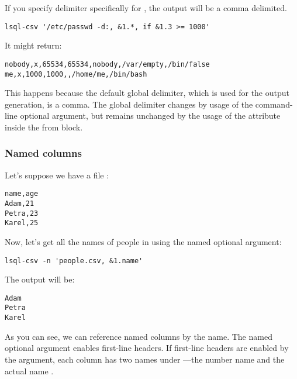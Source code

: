 If you specify delimiter specifically for , the output will be a comma delimited.
\begin{verbatim}
lsql-csv '/etc/passwd -d:, &1.*, if &1.3 >= 1000'
\end{verbatim}
It might return:
\begin{verbatim}
nobody,x,65534,65534,nobody,/var/empty,/bin/false
me,x,1000,1000,,/home/me,/bin/bash
\end{verbatim}

This happens because the default global delimiter, which is used for the output generation, is a comma.
The global delimiter changes by usage of the command-line optional argument, but remains unchanged by the usage of the attribute inside the from block.


\subsubsection{Named columns}
Let's suppose we have a file :
\begin{verbatim}
name,age                                                                                                                                                                                                                                   
Adam,21                                                                                                                                                                                                                                    
Petra,23                                                                                                                                                                                                                                   
Karel,25
\end{verbatim}

Now, let's get all the names of people in  using the  named optional argument:
\begin{verbatim}
lsql-csv -n 'people.csv, &1.name'
\end{verbatim}
The output will be:
\begin{verbatim}
Adam
Petra
Karel
\end{verbatim}

As you can see, we can reference named columns by the name. The named optional argument  enables first-line headers.
If first-line headers are enabled by the argument, each column has two names under ---the number name  and the actual name .


